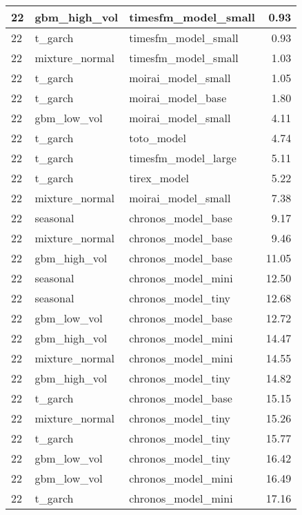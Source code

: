 {\begin{tabular}{lllr}
\midrule
22 & gbm\_high\_vol & timesfm\_model\_small & 0.93 \\
\midrule
22 & t\_garch & timesfm\_model\_small & 0.93 \\
\midrule
22 & mixture\_normal & timesfm\_model\_small & 1.03 \\
\midrule
22 & t\_garch & moirai\_model\_small & 1.05 \\
\midrule
22 & t\_garch & moirai\_model\_base & 1.80 \\
\midrule
22 & gbm\_low\_vol & moirai\_model\_small & 4.11 \\
\midrule
22 & t\_garch & toto\_model & 4.74 \\
\midrule
22 & t\_garch & timesfm\_model\_large & 5.11 \\
\midrule
22 & t\_garch & tirex\_model & 5.22 \\
\midrule
22 & mixture\_normal & moirai\_model\_small & 7.38 \\
\midrule
22 & seasonal & chronos\_model\_base & 9.17 \\
\midrule
22 & mixture\_normal & chronos\_model\_base & 9.46 \\
\midrule
22 & gbm\_high\_vol & chronos\_model\_base & 11.05 \\
\midrule
22 & seasonal & chronos\_model\_mini & 12.50 \\
\midrule
22 & seasonal & chronos\_model\_tiny & 12.68 \\
\midrule
22 & gbm\_low\_vol & chronos\_model\_base & 12.72 \\
\midrule
22 & gbm\_high\_vol & chronos\_model\_mini & 14.47 \\
\midrule
22 & mixture\_normal & chronos\_model\_mini & 14.55 \\
\midrule
22 & gbm\_high\_vol & chronos\_model\_tiny & 14.82 \\
\midrule
22 & t\_garch & chronos\_model\_base & 15.15 \\
\midrule
22 & mixture\_normal & chronos\_model\_tiny & 15.26 \\
\midrule
22 & t\_garch & chronos\_model\_tiny & 15.77 \\
\midrule
22 & gbm\_low\_vol & chronos\_model\_tiny & 16.42 \\
\midrule
22 & gbm\_low\_vol & chronos\_model\_mini & 16.49 \\
\midrule
22 & t\_garch & chronos\_model\_mini & 17.16 \\
\bottomrule
\end{tabular}
}